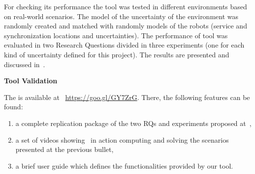 For checking its performance the tool was tested in different environments based on real-world scenarios.
The model of the uncertainty of the environment was randomly created and matched with randomly models of the robots (service and synchronization locations and uncertainties).
The performance of tool was evaluated in two Research Questions divided in three experiments (one for each kind of uncertainty defined for this project).
The results are presented and discussed in~\cite{mapmaker17}.

\textbf{Tool Validation}

The \toolName is available at ~\url{https://goo.gl/GY7ZrG}.
There, the following features can be found:
\begin{enumerate}
\item a complete replication package of the two RQs and experiments proposed at~\cite{mapmaker17},
\item a set of videos showing \toolName\ in action computing and solving the scenarios presented at the previous bullet,
\item a brief user guide which defines the functionalities provided by our tool.
\end{enumerate}
